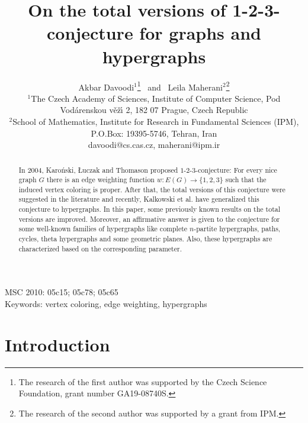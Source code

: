 \documentclass[12pt,a4paper]{article}
\begin{document}
		\title{\Large On the total versions of 1-2-3-conjecture for graphs and hypergraphs}
		\author{\small \hspace*{-1cm} Akbar Davoodi$^1$\footnote{The research of the first author was supported by the Czech Science Foundation, grant number GA19-08740S.}
		 \ and \  Leila Maherani$^2$\footnote{The research of the second author was supported by a grant from IPM.}\\
		{\footnotesize \hspace*{-1cm}$^{1}$The Czech Academy of Sciences, Institute of Computer Science, Pod Vod\'{a}renskou v\v{e}\v{z}\'{\i} 2, 182 07 Prague, Czech Republic}\\
		{\footnotesize \hspace*{-1cm}$^{2}$School of Mathematics, Institute for Research in Fundamental Sciences (IPM), P.O.Box: 19395-5746, Tehran, Iran}\\	
		{\footnotesize \hspace*{-1cm}{\bf E-mails:} davoodi@cs.cas.cz, maherani@ipm.ir}}
	\date {}
	\maketitle
	
\begin{abstract}
{\footnotesize
In 2004, Karo\'nski, \L uczak and Thomason proposed $1$-$2$-$3$-conjecture: For every nice graph $G$  there is an edge weighting function $ w:E(G)\rightarrow\{1,2,3\} $ such that the induced vertex coloring is proper. 	
After that, the total versions of this conjecture were suggested in the literature and recently,  Kalkowski et al. have generalized this conjecture  to  hypergraphs. In this paper, some previously known results on the total versions are improved. Moreover, an affirmative answer is given to the conjecture  for some well-known families of hypergraphs like complete $n$-partite hypergraphs,  paths, cycles, theta hypergraphs and some geometric planes.  Also, these hypergraphs are characterized based on the corresponding parameter.}
\end{abstract}
MSC 2010: 05c15; 05c78; 05c65\\
Keywords: vertex coloring, edge weighting, hypergraphs

\section{Introduction}
\end{document}
